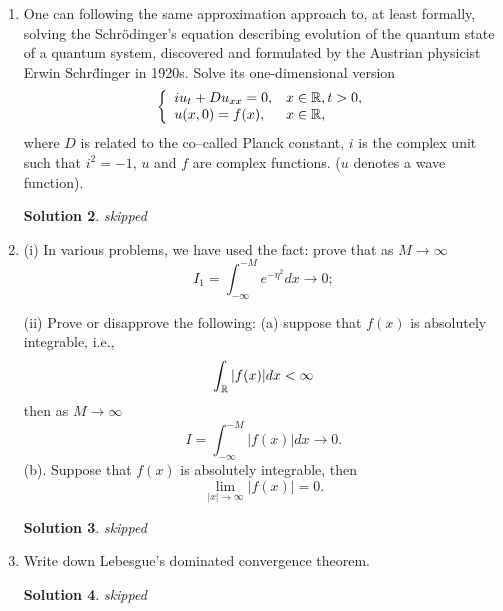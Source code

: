 \documentclass[6pt]{article}
\newtheorem{solution}{Solution}
\numberwithin{equation}{section}
\def\mathbb{\Bbb}
\begin{document}
\begin{enumerate}
\begin{solution}
(1) all requirements in the definition remain the same except that $\mathbb R$ becomes $\mathbb R^N$;

(2) one can simply extend the hat function to $N$D
\end{solution}


\item One can following the same approximation approach to, at least formally, solving the Schr\"odinger's equation describing evolution of the quantum state of a quantum system, discovered and formulated by the Austrian physicist Erwin Schr\"dinger in 1920s.  Solve its one-dimensional version
    \[
\left\{
\begin{array}{ll}
iu_{t}+Du_{xx}=0,&x\in \mathbb R,t>0,\\
u(x,0)=f(x),&x\in \mathbb R,\\
\end{array}
\right.
\]
where $D$ is related to the co--called Planck constant, $i$ is the complex unit such that $i^2=-1$, $u$ and $f$ are complex functions. ($u$ denotes a wave function).
\begin{solution}
skipped
\end{solution}


\item (i) In various problems, we have used the fact: prove that as $M\rightarrow \infty$
\[I_1=\int_{-\infty}^{-M}e^{-\eta ^2}dx\rightarrow 0;\]

(ii)  Prove or disapprove the following: (a)
suppose that $f(x)$ is absolutely integrable, i.e.,
\[\int_\mathbb R|f(x)|dx<\infty\]
then as $M\rightarrow \infty$
\[I=\int_{-\infty}^{-M} |f(x)|dx\rightarrow 0.\]
(b).  Suppose that $f(x)$ is absolutely integrable, then
\[\lim_{|x|\rightarrow\infty} |f(x)|=0.\]
\begin{solution}
skipped
\end{solution}
\item Write down Lebesgue's dominated convergence theorem.
\begin{solution}
skipped
\end{solution}
\end{enumerate}
\end{document}
